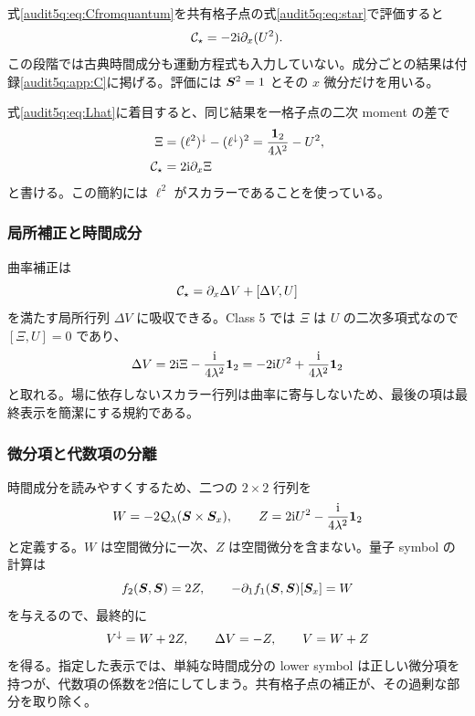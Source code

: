 式\eqref{audit5q:eq:Cfromquantum}を共有格子点の式\eqref{audit5q:eq:star}で評価すると
\begin{equation}
\mathcal C_{\star}=-2\mathrm i\partial_x(U^2).
\label{audit5q:eq:Cresult}
\end{equation}
この段階では古典時間成分も運動方程式も入力していない。成分ごとの結果は付録\ref{audit5q:app:C}に掲げる。評価には $\boldsymbol S^2=1$ とその $x$ 微分だけを用いる。

式\eqref{audit5q:eq:Lhat}に着目すると、同じ結果を一格子点の二次 moment の差で
\begin{align}
\Xi&=(\ell^2)^{\downarrow}-(\ell^{\downarrow})^2
=\frac{\mathbf 1_2}{4\lambda^2}-U^2,\label{audit5q:eq:Xi}\\
\mathcal C_{\star}&=2\mathrm i\partial_x\Xi
\end{align}
と書ける。この簡約には $\ell^2$ がスカラーであることを使っている。

\subsubsection{局所補正と時間成分}

曲率補正は
\begin{equation}
\mathcal C_{\star}=\partial_x\Delta V+[\Delta V,U]
\label{audit5q:eq:absorb}
\end{equation}
を満たす局所行列 $\Delta V$ に吸収できる。Class 5 では $\Xi$ は $U$ の二次多項式なので $[\Xi,U]=0$ であり、
\begin{equation}
\Delta V=2\mathrm i\Xi-\frac{\mathrm i}{4\lambda^2}\mathbf 1_2
=-2\mathrm i U^2+\frac{\mathrm i}{4\lambda^2}\mathbf 1_2
\label{audit5q:eq:DeltaV}
\end{equation}
と取れる。場に依存しないスカラー行列は曲率に寄与しないため、最後の項は最終表示を簡潔にする規約である。

\subsubsection{微分項と代数項の分離}

時間成分を読みやすくするため、二つの $2\times2$ 行列を
\begin{equation}
W=-2\mathcal Q_{\lambda}(\boldsymbol S\times\boldsymbol S_x),\qquad
Z=2\mathrm i U^2-\frac{\mathrm i}{4\lambda^2}\mathbf 1_2
\label{audit5q:eq:WZ}
\end{equation}
と定義する。$W$ は空間微分に一次、$Z$ は空間微分を含まない。量子 symbol の計算は
\begin{equation}
f_2(\boldsymbol S,\boldsymbol S)=2Z,\qquad
-\partial_1f_1(\boldsymbol S,\boldsymbol S)[\boldsymbol S_x]=W
\end{equation}
を与えるので、最終的に
\begin{equation}
V^{\downarrow}=W+2Z,\qquad \Delta V=-Z,\qquad V=W+Z
\label{audit5q:eq:Vcompact}
\end{equation}
を得る。指定した表示では、単純な時間成分の lower symbol は正しい微分項を持つが、代数項の係数を2倍にしてしまう。共有格子点の補正が、その過剰な部分を取り除く。

